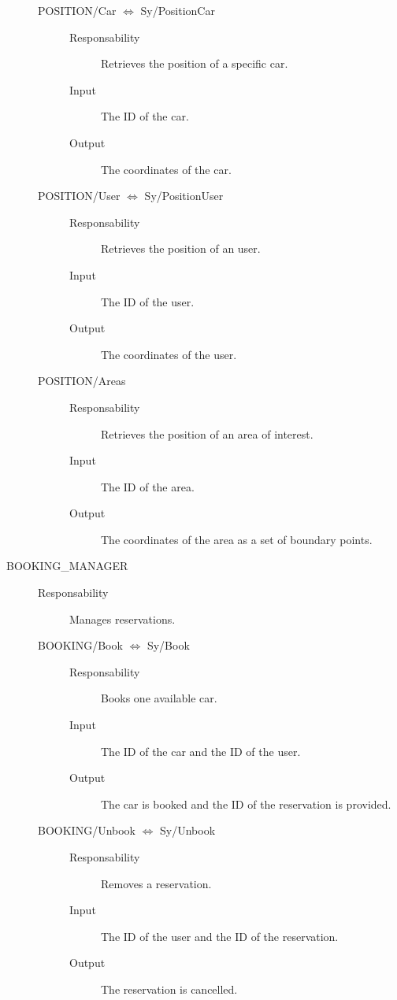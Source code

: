 \documentclass[11pt]{article} %
\begin{document}
\begin{description}
\begin{description}
	\item[POSITION/Car $\Leftrightarrow$ Sy/PositionCar] \hfill
		\begin{description}
			\item[Responsability] Retrieves the position of a specific car.
			\item[Input] The ID of the car.
			\item[Output] The coordinates of the car.
		\end{description}

	\item[POSITION/User $\Leftrightarrow$ Sy/PositionUser] \hfill
		\begin{description}
			\item[Responsability] Retrieves the position of an user.
			\item[Input] The ID of the user.
			\item[Output] The coordinates of the user.
		\end{description}

	\item[POSITION/Areas] \hfill
		\begin{description}
			\item[Responsability]Retrieves the position of an area of interest.
			\item[Input] The ID of the area.
			\item[Output] The coordinates of the area as a set of boundary points.
		\end{description}
	\end{description}
	
	\item[BOOKING\_MANAGER] \hfill
	\begin{description}
		\item[Responsability] Manages reservations.

	\item[BOOKING/Book $\Leftrightarrow$ Sy/Book] \hfill
		\begin{description}
			\item[Responsability] Books one available car.
			\item[Input] The ID of the car and the ID of the user.
			\item[Output] The car is booked and the ID of the reservation is provided.
		\end{description}

	\item[BOOKING/Unbook $\Leftrightarrow$ Sy/Unbook] \hfill
		\begin{description}
			\item[Responsability] Removes a reservation.
			\item[Input] The ID of the user and the ID of the reservation.
			\item[Output] The reservation is cancelled.
		\end{description}


\end{description}
\end{description}
\end{document}
